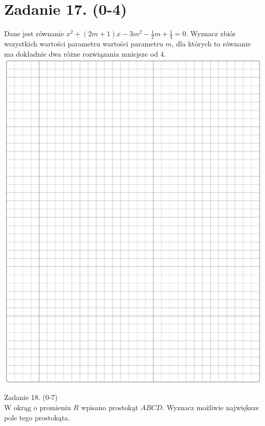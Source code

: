 \documentclass[10pt]{article}
\begin{document}
\section*{Zadanie 17. (0-4)}
Dane jest równanie \(x^{2}+(2 m+1) x-3 m^{2}-\frac{1}{2} m+\frac{1}{4}=0\). Wyznacz zbiór wszystkich wartości parametru wartości parametru \(m\), dla których to równanie ma dokładnie dwa różne rozwiązania mniejsze od 4.\\
\includegraphics[max width=\textwidth, center]{2024_11_21_06df787f12c5337a1fe8g-14}

Zadanie 18. (0-7)\\
W okrąg o promieniu \(R\) wpisano prostokąt \(A B C D\). Wyznacz możliwie największe pole tego prostokąta.
\end{document}
